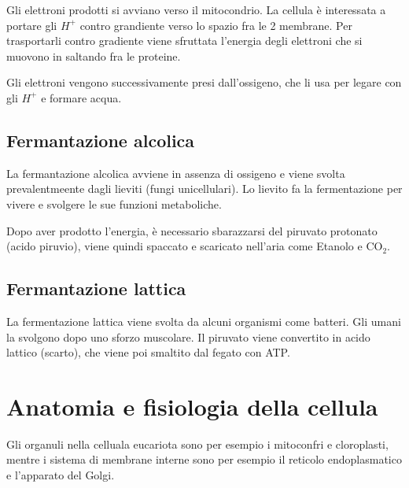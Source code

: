 \documentclass[a4paper]{article}
\begin{document}
Gli elettroni prodotti si avviano verso il mitocondrio. La cellula è interessata a portare
gli \(H^+\) contro grandiente verso lo spazio fra le 2 membrane.
Per trasportarli contro gradiente viene sfruttata l'energia degli elettroni che si muovono in saltando fra le proteine.

Gli elettroni vengono successivamente presi dall'ossigeno, che li usa per legare con gli \(H^+\) e formare
acqua.

\subsection{Fermantazione alcolica}

La fermantazione alcolica avviene in assenza di ossigeno e viene svolta prevalentmeente dagli lieviti (fungi unicellulari).
Lo lievito fa la fermentazione per vivere e svolgere le sue funzioni metaboliche.

Dopo aver prodotto l'energia, è necessario sbarazzarsi del piruvato protonato (acido piruvio),
viene quindi spaccato e scaricato nell'aria come Etanolo e CO\({}_2\).

\subsection{Fermantazione lattica}

La fermentazione lattica viene svolta da alcuni organismi come batteri.
Gli umani la svolgono dopo uno sforzo muscolare.
Il piruvato viene convertito in acido lattico (scarto), che viene poi smaltito dal fegato con ATP.

\pagebreak

\section{Anatomia e fisiologia della cellula}


Gli organuli nella celluala eucariota sono per esempio i mitoconfri e cloroplasti,
mentre i sistema di membrane interne sono per esempio il reticolo endoplasmatico
e l'apparato del Golgi.
\end{document}
